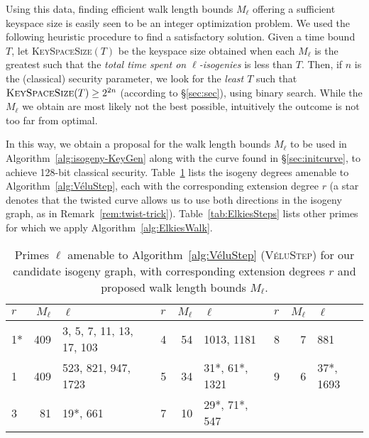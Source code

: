 \documentclass{llncs}
\newcommand{\algstyle}[1]{\textsc{#1}}
\begin{document}
Using this data, finding efficient walk length bounds $M_\ell$
offering a sufficient keyspace size is easily seen to be an
integer optimization problem. 
We used the following heuristic procedure
to find a satisfactory solution.
Given a time bound $T$, let \algstyle{KeySpaceSize}$(T)$ be
the keyspace size obtained when each $M_\ell$ is the greatest such
that the \emph{total time spent on $\ell$-isogenies} is less than $T$.
Then, if $n$ is the (classical) security parameter,
we look for the \emph{least $T$} such that
$
	\algstyle{KeySpaceSize}(T)\geq 2^{2n}
$
(according to \S\ref{sec:sec}), using binary search.
While the $M_\ell$
we obtain are most likely not the best possible, intuitively
the outcome is not too far from optimal.

In this way, we obtain a proposal for the walk length bounds $M_\ell$
to be used in Algorithm~\ref{alg:isogeny-KeyGen} along with the curve
found in \S\ref{sec:initcurve}, to achieve 128-bit
classical security. Table~\ref{tab:VéluSteps}
lists the isogeny degrees amenable to Algorithm~\ref{alg:VéluStep},
each with the corresponding extension degree $r$ 
(a star denotes that the twisted curve
allows us to use both directions in the isogeny graph,
as in Remark~\ref{rem:twist-trick}).
Table~\ref{tab:ElkiesSteps}
lists other primes for which we apply Algorithm~\ref{alg:ElkiesWalk}.

\begin{table}
    \centering
    \begin{tabular}{l|@{\;}r@{\;}|@{\;}l@{\;}||l|@{\;}r@{\;}|@{\;}l@{\;}||@{\;}l|r@{\;}|@{\;}l}
        $r$ & $M_\ell$ & $\ell$
        &
        $r$ & $M_\ell$ & $\ell$
        &
        $r$ & $M_\ell$ & $\ell$
        \\
        \hline
        1* & 409 & 3, 5, 7, 11, 13, 17, 103
        &
        4 & 54 & 1013, 1181
        &
        8 & 7 & 881
        \\
        1 & 409 & 523, 821, 947, 1723
        &
        5 & 34 & 31*, 61*, 1321
        &
        9 & 6 & 37*, 1693
        \\
        3 & 81 & 19*, 661
        &
        7 & 10 & 29*, 71*, 547
        & & 
        \\
        \hline
    \end{tabular}
    \smallskip
    \caption{Primes $\ell$ amenable to Algorithm~\ref{alg:VéluStep}
		(\algstyle{VéluStep}) for our candidate isogeny graph,
    with corresponding extension degrees $r$ 
    and proposed walk length bounds $M_\ell$.}
    \label{tab:VéluSteps}
\end{table}
\end{document}
